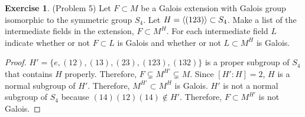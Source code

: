 \documentclass[12pt, psamsfonts]{amsart}
\theoremstyle{definition}
\newtheorem*{exer}{Exercise}
\theoremstyle{remark}
\numberwithin{equation}{section}
\begin{document}
\begin{exer}{(Problem 5)}
  Let $F \subset M$ be a Galois extension with Galois group isomorphic to the symmetric group $S_4$.
  Let $H = \ev{(123)} \subset S_4$.
  Make a list of the intermediate fields in the extension, $F \subset M^H$.
  For each intermediate field $L$ indicate whether or not $F \subset L$ is Galois and whether or not $L \subset M^H$ is Galois.
\end{exer}

\begin{proof}
  $H' = \{ e, (12), (13), (23), (123), (132) \}$ is a proper subgroup of $S_4$ that contains $H$ properly.
  Therefore, $F \subsetneq M^{H'} \subsetneq M$.
  Since $[H':H] = 2$, $H$ is a normal subgroup of $H'$.
  Therefore, $M^{H'} \subset M^{H}$ is Galois.
  $H'$ is not a normal subgroup of $S_4$ because $(14)(12)(14) \notin H'$.
  Therefore, $F \subset M^{H'}$ is not Galois.
\end{proof}
\end{document}
